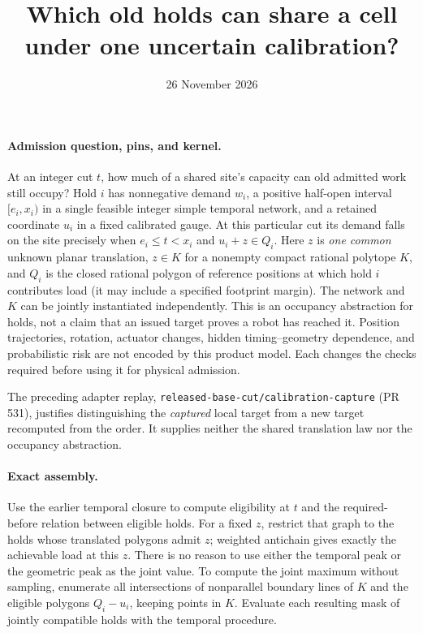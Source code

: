 \documentclass[11pt]{article}
\title{Which old holds can share a cell under one uncertain calibration?}
\date{26 November 2026}
\begin{document}
\maketitle

\paragraph{Admission question, pins, and kernel.}
At an integer cut $t$, how much of a shared site's capacity can old
admitted work still occupy? Hold $i$ has nonnegative demand $w_i$,
a positive half-open interval $[e_i,x_i)$ in a single feasible
integer simple temporal network, and a retained coordinate $u_i$ in
a fixed calibrated gauge. At this particular cut its demand falls on
the site precisely when $e_i\leq t<x_i$ and $u_i+z\in Q_i$.
Here $z$ is \emph{one common} unknown planar translation,
$z\in K$ for a nonempty compact rational polytope $K$, and $Q_i$
is the closed rational polygon of reference positions at which hold
$i$ contributes load (it may include a specified footprint margin).
The network and $K$ can be jointly instantiated independently.
This is an occupancy abstraction for holds, not a claim that an issued
target proves a robot has reached it. Position trajectories, rotation,
actuator changes, hidden timing--geometry dependence, and probabilistic
risk are not encoded by this product model. Each changes the checks
required before using it for physical admission.

The preceding adapter replay, \texttt{released-base-cut/calibration-capture}
(PR 531), justifies distinguishing the \emph{captured} local target from a
new target recomputed from the order. It supplies neither the shared
translation law nor the occupancy abstraction.

\paragraph{Exact assembly.}
Use the earlier temporal closure to compute eligibility at $t$ and the
required-before relation between eligible holds. For a fixed $z$, restrict
that graph to the holds whose translated polygons admit $z$; weighted
antichain gives exactly the achievable load at this $z$. There is no reason
to use either the temporal peak or the geometric peak as the joint value.
To compute the joint maximum without sampling, enumerate all intersections
of nonparallel boundary lines of $K$ and the eligible
polygons $Q_i-u_i$, keeping points in $K$. Evaluate each resulting mask
of jointly compatible holds with the temporal procedure.
\end{document}
